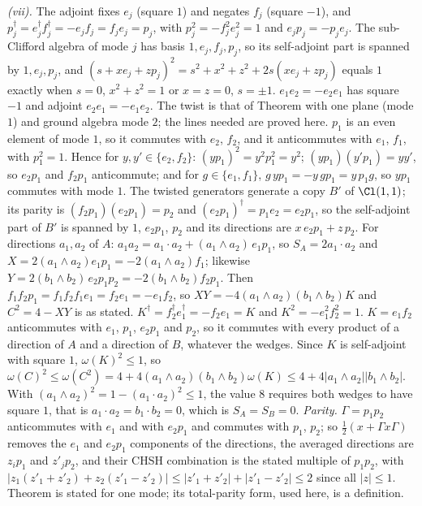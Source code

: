 \emph{(vii).} The adjoint fixes $e_{j}$ (square $1$) and negates $f_{j}$ (square $-1$), and $p_{j}^{\dagger} = e_{j}^{\dagger}f_{j}^{\dagger} = -e_{j}f_{j} = f_{j}e_{j} = p_{j}$, with $p_{j}^{2} = -f_{j}^{2}e_{j}^{2} = 1$ and $e_{j}p_{j} = -p_{j}e_{j}$. The sub-Clifford algebra of mode $j$ has basis $1, e_{j}, f_{j}, p_{j}$, so its self-adjoint part is spanned by $1, e_{j}, p_{j}$, and $(s + xe_{j} + zp_{j})^{2} = s^{2} + x^{2} + z^{2} + 2s(xe_{j} + zp_{j})$ equals $1$ exactly when $s = 0$, $x^{2} + z^{2} = 1$ or $x = z = 0$, $s = \pm 1$. $e_{1}e_{2} = -e_{2}e_{1}$ has square $-1$ and adjoint $e_{2}e_{1} = -e_{1}e_{2}$. The twist is that of Theorem  with one plane (mode $1$) and ground algebra mode $2$; the lines needed are proved here. $p_{1}$ is an even element of mode $1$, so it commutes with $e_{2}$, $f_{2}$, and it anticommutes with $e_{1}$, $f_{1}$, with $p_{1}^{2} = 1$. Hence for $y, y' \in \{e_{2}, f_{2}\}$: $(yp_{1})^{2} = y^{2}p_{1}^{2} = y^{2}$; $(yp_{1})(y'p_{1}) = yy'$, so $e_{2}p_{1}$ and $f_{2}p_{1}$ anticommute; and for $g \in \{e_{1}, f_{1}\}$, $g\,yp_{1} = -y\,gp_{1} = y\,p_{1}g$, so $yp_{1}$ commutes with mode $1$. The twisted generators generate a copy $B'$ of $\Cl(1,1)$; its parity is $(f_{2}p_{1})(e_{2}p_{1}) = p_{2}$ and $(e_{2}p_{1})^{\dagger} = p_{1}e_{2} = e_{2}p_{1}$, so the self-adjoint part of $B'$ is spanned by $1$, $e_{2}p_{1}$, $p_{2}$ and its directions are $x\,e_{2}p_{1} + z\,p_{2}$. For directions $a_{1}, a_{2}$ of $A$: $a_{1}a_{2} = a_{1} \cdot a_{2} + (a_{1} \wedge a_{2})\,e_{1}p_{1}$, so $S_{A} = 2a_{1} \cdot a_{2}$ and $X = 2(a_{1} \wedge a_{2})e_{1}p_{1} = -2(a_{1} \wedge a_{2})f_{1}$; likewise $Y = 2(b_{1} \wedge b_{2})\,e_{2}p_{1}p_{2} = -2(b_{1} \wedge b_{2})f_{2}p_{1}$. Then $f_{1}f_{2}p_{1} = f_{1}f_{2}f_{1}e_{1} = f_{2}e_{1} = -e_{1}f_{2}$, so $XY = -4(a_{1} \wedge a_{2})(b_{1} \wedge b_{2})K$ and $C^{2} = 4 - XY$ is as stated. $K^{\dagger} = f_{2}^{\dagger}e_{1}^{\dagger} = -f_{2}e_{1} = K$ and $K^{2} = -e_{1}^{2}f_{2}^{2} = 1$. $K = e_{1}f_{2}$ anticommutes with $e_{1}$, $p_{1}$, $e_{2}p_{1}$ and $p_{2}$, so it commutes with every product of a direction of $A$ and a direction of $B$, whatever the wedges. Since $K$ is self-adjoint with square $1$, $\omega(K)^{2} \le 1$, so $\omega(C)^{2} \le \omega(C^{2}) = 4 + 4(a_{1} \wedge a_{2})(b_{1} \wedge b_{2})\omega(K) \le 4 + 4|a_{1} \wedge a_{2}||b_{1} \wedge b_{2}|$. With $(a_{1} \wedge a_{2})^{2} = 1 - (a_{1} \cdot a_{2})^{2} \le 1$, the value $8$ requires both wedges to have square $1$, that is $a_{1} \cdot a_{2} = b_{1} \cdot b_{2} = 0$, which is $S_{A} = S_{B} = 0$. \emph{Parity.} $\Gamma = p_{1}p_{2}$ anticommutes with $e_{1}$ and with $e_{2}p_{1}$ and commutes with $p_{1}$, $p_{2}$; so $\tfrac12(x + \Gamma x\Gamma)$ removes the $e_{1}$ and $e_{2}p_{1}$ components of the directions, the averaged directions are $z_{i}p_{1}$ and $z'_{j}p_{2}$, and their CHSH combination is the stated multiple of $p_{1}p_{2}$, with $|z_{1}(z'_{1} + z'_{2}) + z_{2}(z'_{1} - z'_{2})| \le |z'_{1} + z'_{2}| + |z'_{1} - z'_{2}| \le 2$ since all $|z| \le 1$. Theorem  is stated for one mode; its total-parity form, used here, is a definition.

